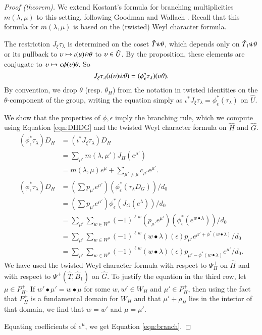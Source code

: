 \begin{proof}[Proof (theorem)]
  We extend Kostant's formula for branching multiplicities
  $m(\lambda,\mu)$ to this setting, following Goodman and Wallach
  \cite[\S8.2.2]{goodman}.  Recall that this formula for
  $m(\lambda,\mu)$ is based on the (twisted) Weyl character formula.

  The restriction $J_\xi\tau_\lambda$ is determined on the coset 
  $\hat T\dot w \theta$, which depends only on $\hat T_1 \dot w\theta$ or its
  pullback to $\upsilon\mapsto \iota(u)\dot w\theta$ to $\upsilon\in \hat U$.  By
  the proposition, these elements are conjugate to $\upsilon\mapsto
  \epsilon\phi(\upsilon)\theta$.  So 
\[
J_\xi\tau_\lambda (\iota(\upsilon)\dot w \theta) = (\phi_\epsilon^*\tau_\lambda)(\upsilon\theta).
\]
By convention, we drop $\theta$ (resp. $\theta_H$) from the notation in
twisted identities on the
$\theta$-component of the group, writing the equation simply as
$\iota^*J_\xi\tau_\lambda = \phi_\epsilon^*(\tau_\lambda)$ on $\hat U$.

  We show that the properties of $\phi,\epsilon$ imply the branching
  rule, which we compute using Equation \ref{eqn:DHDG} and the twisted
  Weyl character formula on $\hat H$ and $\hat G$.  
\begin{align*}
(\phi^*_\epsilon\tau_\lambda) D_H 
 &= (\iota^*J_\xi\tau_\lambda) D_H\\
 &= \sum_{\mu'} m(\lambda,{\mu'}) J_H(e^{\mu'})\\
  &= m(\lambda,\mu)e^\mu + \sum_{\mu'\ne\mu} c_{\mu'} e^{\mu'}.\\
(\phi^*_\epsilon\tau_\lambda) D_H 
  &= (\sum p_{\mu'} e^{\mu'})(\phi^*_\epsilon(\tau_\lambda D_{G})) /d_0\\
  &= (\sum p_{\mu'} e^{\mu'}) \phi^*_\epsilon(J_G(e^\lambda)) /d_0\\
  &= \sum_{\mu'} \sum_{w\in W^\theta} (-1)^{\ell w} 
  (p_{\mu'} e^{\mu'}) (\phi^*_\epsilon (e^{w\bullet \lambda})) /d_0\\
  &= \sum_{\mu'} \sum_{w\in W^\theta} (-1)^{\ell w}  
 ({w\bullet\lambda})(\epsilon) p_{\mu'}
e^{\mu'+\phi^*(w\bullet \lambda)} /d_0\\
  &= \sum_{\mu'} \sum_{w\in W^\theta} 
(-1)^{\ell w} ({w\bullet\lambda})(\epsilon) 
 p_{\mu' - \phi^*({w\bullet \lambda})} e^{\mu'} /d_0.
\end{align*}
We have used the twisted Weyl character formula with respect to $\Psi^+_H$ on $\hat H$
and with respect to $\Psi^+(\hat T,\hat B_1)$  on $\hat G$.
To justify the equation in the third row, let $\mu\in P_H^+$.  If
$w'\bullet \mu' = w\bullet \mu$ for some $w,w'\in W_H$ and $\mu'\in
P_H^+$, then using the fact that $P_H^+$ is a fundamental domain for
$W_H$ and that $\mu'+\rho_H$ lies in the interior of that domain, we
find that $w=w'$ and $\mu=\mu'$.

Equating coefficients of $e^\mu$, we get Equation \ref{eqn:branch}.
\end{proof}



